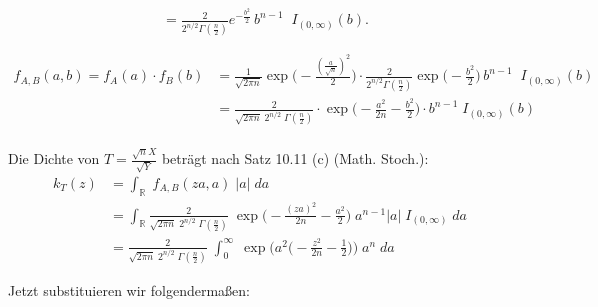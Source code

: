 \documentclass[12pt]{article}
\begin{document}
\begin{description}
{\begin{equation*}
\begin{split}
			\\&= \frac{2}{2^{n/2} \Gamma(\frac{n}{2})} e^{-\frac{b^2}{2}} \,b^{n-1} \;  \;I_{(0,\infty)}(b).\\\\ 
			\end{split}\end{equation*} 
					\begin{equation*}\begin{split}
							f_{A,B} (a,b) = f_A(a) \cdot f_B(b) &= \frac{1}{\sqrt{2\pi n}} \exp\Big(-\frac{(\frac{a}{\sqrt{n}})^2}{2}\Big) \cdot \frac{2}{2^{n/2} \Gamma(\frac{n}{2})} \exp\Big(-\frac{b^2}{2}\Big) \,b^{n-1} \;  \;I_{(0,\infty)}(b)
							\\&= \frac{2}{\sqrt{2\pi n}\;2^{n/2}\; \Gamma(\frac{n}{2})} \cdot \exp\Big(-\frac{a^2}{2n}-\frac{b^2}{2}\Big) \cdot b^{n-1} \;I_{(0,\infty)}(b)
					\end{split}\end{equation*} \\ Die Dichte von $T = \frac{\sqrt{n}X}{\sqrt{Y}}$ beträgt nach Satz 10.11 (c) (Math. Stoch.):
			\begin{equation*}\begin{split}
				k_T(z) &= \int_{\mathbb{R}} \; f_{A,B} (za,a)\;|a|\; da 
					 \\&= \int_{\mathbb{R}} \frac{2}{\sqrt{2\pi n} \; 2^{n/2}\; \Gamma(\frac{n}{2})} \; \exp\Big(-\frac{(za)^2}{2n} -\frac{a^2}{2}  \Big) \; a^{n-1} |a| \; I_{(0,\infty)}\; da 
					\\&= \frac{2}{\sqrt{2\pi n} \; 2^{n/2}\; \Gamma(\frac{n}{2})} \; \int_0^\infty \; \exp\Big(a^2\big(-\frac{z^2}{2n} -\frac{1}{2}\big) \Big)\; a^n \; da
			\end{split}\end{equation*}
			}
	\end{description}

Jetzt substituieren wir folgendermaßen:
\end{document}
